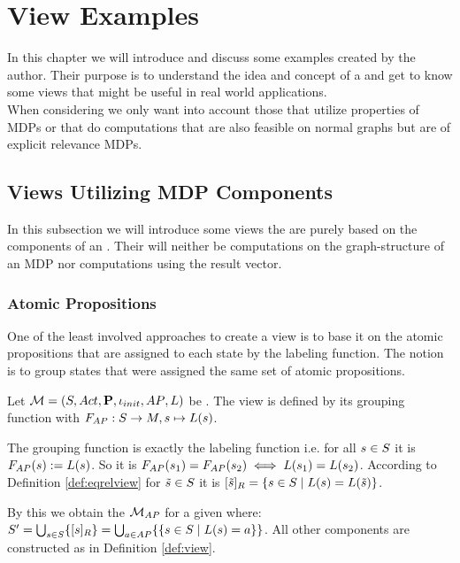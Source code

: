 \documentclass[preview]{standalone}
\begin{document}
\section{View Examples}
In this chapter we will introduce and discuss some \viewN examples created by the author. Their purpose is to understand the idea and concept of a \viewN and get to know some views that might be useful in real world applications. \\
When considering \viewsN we only want into account those that utilize properties of MDPs or that do computations that are also feasible on normal graphs but are of explicit relevance MDPs.
\subsection{Views Utilizing MDP Components}
In this subsection we will introduce some views the are purely based on the components of an \mdpN. Their will neither be computations on the graph-structure of an MDP nor computations using the result vector.
\subsubsection{Atomic Propositions}
One of the least involved approaches to create a view is to base it on the atomic propositions that are assigned to each state by the labeling function. The notion is to group states that were assigned the same set of atomic propositions. 


\begin{definition}	
	Let ${{{\mathcal{M}}}} = {{({S}, {Act}, {\textbf{P}}, {\iota_{init}}, {AP}, {L})}}$ be \chosengraphtypeN. The view \viewatomicprops is defined by its grouping function \gfctatomicprops \grpfctN with $\gfctatomicprops : \states \to \imggrp, {\state}\mapsto{\labelingfct(\state)}$.
\end{definition}

The grouping function is exactly the labeling function i.e. for all ${s} \in {S}$ it is ${{F_{{AP}}}}({s}) := {L}({s})$. So it is ${{F_{{AP}}}}({s}_1) = {{F_{{AP}}}}({s}_2) \iff {L}({s}_1) = {L}({s}_2)$. According to Definition \ref{def:eqrelview} for ${\tilde{{s}}} \in {S}$ it is ${{[{\tilde{{s}}}]_{{R}}}} = \{{s} \in {S} \mid {L}({s}) = {L}({\tilde{{s}}})\}$.

By this we obtain the \viewN ${{{{{\mathcal{M}}}}_{{AP}}}}$ for a given \chosengraphtypeN \chgph where: ${S}' = \bigcup_{{s} \in {S}} \{{{[{s}]_{{R}}}}\} =  \bigcup_{a \in {AP}} \{\{{s} \in {S} \mid {L}({s}) = a\}\}$. All other components are constructed as in Definition \ref{def:view}.
\end{document}
